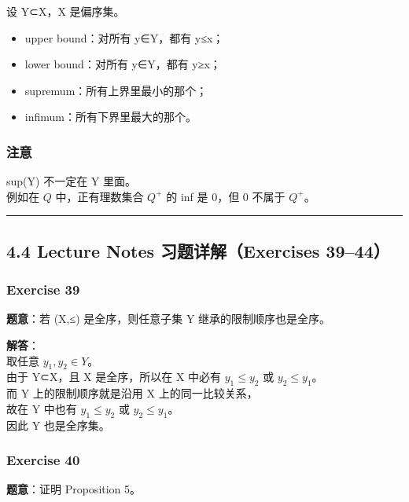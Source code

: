 \documentclass[
  11pt,
]{article}
\providecommand{\tightlist}{%
  \setlength{\itemsep}{0pt}\setlength{\parskip}{0pt}}
\begin{document}
设 Y⊂X，X 是偏序集。

\begin{itemize}
\tightlist
\item
  upper bound：对所有 y∈Y，都有 y≤x；
\item
  lower bound：对所有 y∈Y，都有 y≥x；
\item
  supremum：所有上界里最小的那个；
\item
  infimum：所有下界里最大的那个。
\end{itemize}

\subsubsection{注意}\label{ux6ce8ux610f}

sup(Y) 不一定在 Y 里面。\\
例如在 \(Q\) 中，正有理数集合 \(Q^+\) 的 inf 是 \(0\)，但 \(0\) 不属于
\(Q^+\)。

\begin{center}\rule{0.5\linewidth}{0.5pt}\end{center}

\subsection{4.4 Lecture Notes 习题详解（Exercises
39--44）}\label{lecture-notes-ux4e60ux9898ux8be6ux89e3exercises-3944}

\subsubsection{Exercise 39}\label{exercise-39}

\textbf{题意}：若 (X,≤) 是全序，则任意子集 Y 继承的限制顺序也是全序。

\textbf{解答}：\\
取任意 \(y_1,y_2\in Y\)。\\
由于 Y⊂X，且 X 是全序，所以在 X 中必有 \(y_1\le y_2\) 或
\(y_2\le y_1\)。\\
而 Y 上的限制顺序就是沿用 X 上的同一比较关系，\\
故在 Y 中也有 \(y_1\le y_2\) 或 \(y_2\le y_1\)。\\
因此 Y 也是全序集。

\subsubsection{Exercise 40}\label{exercise-40}

\textbf{题意}：证明 Proposition 5。
\end{document}
